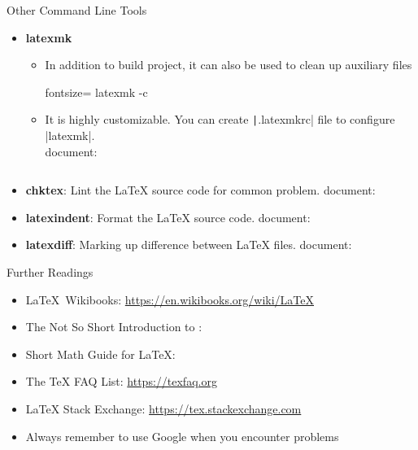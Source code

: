 \begin{frame}[fragile]{Other Command Line Tools}
  \begin{itemize}
    \item \textbf{latexmk}
          \begin{itemize}
            \item In addition to build project, it can also be used to clean up auxiliary files
                  \begin{bashcode*}{fontsize=\scriptsize}
                    latexmk -c
                  \end{bashcode*}
            \item It is highly customizable. You can create \texttt|.latexmkrc| file to configure \bashinline|latexmk|. \\ document: 
                  \inputminted[fontsize=\scriptsize]{perl}{./minted/latexmkrc}
          \end{itemize}
    \item \textbf{chktex}: Lint the \LaTeX{} source code for common problem. document: 
    \item \textbf{latexindent}: Format the \LaTeX{} source code. document: 
    \item \textbf{latexdiff}: Marking up difference between \LaTeX{} files. document: 
  \end{itemize}
\end{frame}

\begin{frame}{Further Readings}
  \begin{itemize}
    \item \LaTeX~Wikibooks: \url{https://en.wikibooks.org/wiki/LaTeX}
    \item The Not So Short Introduction to \LaTeXe: 
    \item Short Math Guide for \LaTeX: 
    \item The TeX FAQ List: \url{https://texfaq.org}
    \item LaTeX Stack Exchange: \url{https://tex.stackexchange.com}
    \item Always remember to use \alert{Google} when you encounter problems
  \end{itemize}
\end{frame}


